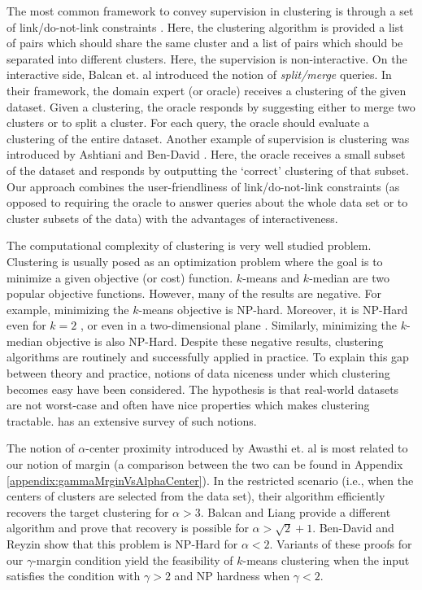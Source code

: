 \documentclass[12pt]{article}
\begin{document}
The most common framework to convey supervision in clustering is through a set of link/do-not-link constraints \cite{basu2002semi,basu2004probabilistic, kulis2009semi}. Here, the clustering algorithm is provided a list of pairs which should share the same cluster and a list of pairs which should be separated into different clusters. Here, the supervision is non-interactive. On the interactive side, Balcan et. al \cite{balcan2008clustering} introduced the notion of \textit{split/merge} queries. In their framework, the domain expert (or oracle) receives a clustering of the given dataset. Given a clustering, the oracle responds by suggesting either to merge two clusters or to split a cluster. For each query, the oracle should evaluate a clustering of the entire dataset. Another example of supervision is clustering was introduced by Ashtiani and Ben-David \cite{ashtiani2015representation}. Here, the oracle receives a small subset of the dataset and responds by outputting the `correct' clustering of that subset. Our approach combines the user-friendliness of link/do-not-link constraints (as opposed to requiring the oracle to answer queries about the whole data set or to cluster subsets of the data) with the advantages of interactiveness. 

The computational complexity of clustering is very well studied problem. Clustering is usually posed as an optimization problem where the goal is to minimize a given objective (or cost) function. $k$-means and $k$-median are two popular objective functions. However, many of the results are negative. For example, minimizing the $k$-means objective is NP-hard. Moreover, it is NP-Hard even for $k=2$ \cite{dasgupta2008hardness}, or even in a two-dimensional plane \cite{vattani2009hardness,mahajan2009planar}. Similarly, minimizing the $k$-median objective is also NP-Hard. Despite these negative results, clustering algorithms are routinely and successfully applied in practice. To explain this gap between theory and practice, notions of data niceness under which clustering becomes easy have been considered. The hypothesis is that real-world datasets are not worst-case and often have nice properties which makes clustering tractable. \cite{Ben-David15} has an extensive survey of such notions.

The notion of $\alpha$-center proximity introduced by Awasthi et. al \cite{awasthi2012center} is most related to our notion of margin (a comparison between the two can be found in Appendix \ref{appendix:gammaMrginVsAlphaCenter}). In the restricted scenario (i.e., when the centers of clusters are selected from the data set), their algorithm efficiently recovers the target clustering for $\alpha > 3$.  Balcan and Liang \cite{balcan2012clustering} provide a different algorithm and prove that recovery is possible for $\alpha > \sqrt{2} + 1$. Ben-David and Reyzin \cite{ben2014data} show that this problem is NP-Hard for $\alpha < 2$. Variants of these proofs for our $\gamma$-margin condition yield the feasibility of $k$-means clustering when the input satisfies the condition with $\gamma >2$ and NP hardness when $\gamma <2$.
\end{document}
